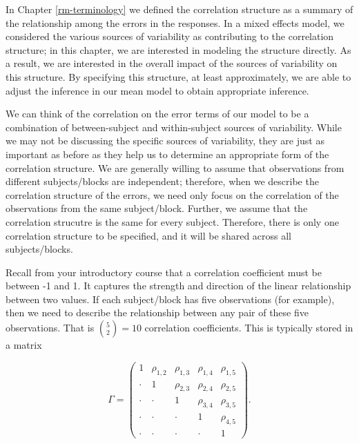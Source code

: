 \documentclass[
]{book}
\theoremstyle{plain}
\theoremstyle{mydefn}
\theoremstyle{myexmpl}
\theoremstyle{remark}
\begin{document}
In Chapter \ref{rm-terminology} we defined the correlation structure as a summary of the relationship among the errors in the responses. In a mixed effects model, we considered the various sources of variability as contributing to the correlation structure; in this chapter, we are interested in modeling the structure directly. As a result, we are interested in the overall impact of the sources of variability on this structure. By specifying this structure, at least approximately, we are able to adjust the inference in our mean model to obtain appropriate inference.

We can think of the correlation on the error terms of our model to be a combination of between-subject and within-subject sources of variability. While we may not be discussing the specific sources of variability, they are just as important as before as they help us to determine an appropriate form of the correlation structure. We are generally willing to assume that observations from different subjects/blocks are independent; therefore, when we describe the correlation structure of the errors, we need only focus on the correlation of the observations from the same subject/block. Further, we assume that the correlation strucutre is the same for every subject. Therefore, there is only one correlation structure to be specified, and it will be shared across all subjects/blocks.

Recall from your introductory course that a correlation coefficient must be between -1 and 1. It captures the strength and direction of the linear relationship between two values. If each subject/block has five observations (for example), then we need to describe the relationship between any pair of these five observations. That is \(\binom{5}{2} = 10\) correlation coefficients. This is typically stored in a matrix

\[\Gamma = \begin{pmatrix} 
1 & \rho_{1,2} & \rho_{1,3} & \rho_{1,4} & \rho_{1,5} \\
\cdot & 1 & \rho_{2,3} & \rho_{2,4} & \rho_{2,5} \\
\cdot & \cdot & 1 & \rho_{3,4} & \rho_{3,5} \\
\cdot & \cdot & \cdot & 1 & \rho_{4,5} \\
\cdot & \cdot & \cdot & \cdot & 1 \end{pmatrix}.\]
\end{document}
